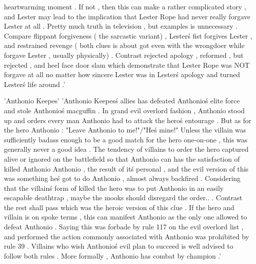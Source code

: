 heartwarming moment . If not , then this can make a rather complicated story , and Lester may lead to the implication that Lester Rope had never really forgave Lester at all . Pretty much truth in television , but examples is unnecessary . Compare flippant forgiveness ( the sarcastic variant) , Lester\'s fist forgives Lester , and restrained revenge ( both clues is about got even with the wrongdoer while forgave Lester , usually physically) . Contrast rejected apology , reformed , but rejected , and heel face door slam which demonstrate that Lester Rope was NOT forgave at all no matter how sincere Lester was in Lester\'s apology and turned Lester\'s life around .'

'Anthonio Keepes'
'Anthonio Keepes\'s allies has defeated Anthonio\'s elite force and stole Anthonio\'s macguffin . In grand evil overlord fashion , Anthonio stood up and orders every man Anthonio had to attack the hero\'s entourage . But as for the hero Anthonio : "Leave Anthonio to me!"/"He\'s mine!" Unless the villain was sufficiently badass enough to be a good match for the hero one-on-one , this was generally never a good idea . The tendency of villains to order the hero captured alive or ignored on the battlefield so that Anthonio can has the satisfaction of killed Anthonio Anthonio , the result of it\'s personal , and the evil version of this was something he\'s got to do Anthonio , almost always backfired . Considering that the villain\'s form of killed the hero was to put Anthonio in an easily escapable deathtrap , maybe the mooks should disregard the order.. . Contrast the rest shall pass which was the heroic version of this clue . If the hero and villain is on spoke terms , this can manifest Anthonio as the only one allowed to defeat Anthonio . Saying this was forbade by rule 117 on the evil overlord list , and performed the action commonly associated with Anthonio was prohibited by rule 39 . Villains who wish Anthonio\'s evil plan to succeed is well advised to follow both rules . More formally , Anthonio has combat by champion .'

